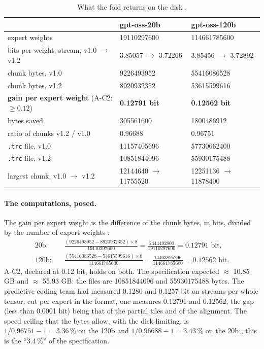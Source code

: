 \begin{table}[ht]
\centering\small
\caption[What the fold returns on the disk]{What the fold returns on the disk \mes.}
\label{t3cod:tab:tailles}
\begin{tabular}{@{}lll@{}}
\toprule
& gpt-oss-20b & gpt-oss-120b \\
\midrule
expert weights & \num{19110297600} & \num{114661785600} \\
bits per weight, stream, v1.0 $\to$ v1.2 & 3.85057 $\to$ 3.72266 & 3.85456 $\to$ 3.72892 \\
chunk bytes, v1.0 & \num{9226493952} & \num{55416086528} \\
chunk bytes, v1.2 & \num{8920932352} & \num{53615599616} \\
\textbf{gain per expert weight} (A-C2: $\ge 0.12$) & \textbf{0.12791 bit} & \textbf{0.12562 bit} \\
bytes saved & \num{305561600} & \num{1800486912} \\
ratio of chunks v1.2 / v1.0 & 0.96688 & 0.96751 \\
\texttt{.trc} file, v1.0 & \num{11157405696} & \num{57730662400} \\
\texttt{.trc} file, v1.2 & \num{10851844096} & \num{55930175488} \\
largest chunk, v1.0 $\to$ v1.2 & \num{12144640} $\to$ \num{11755520} & \num{12251136} $\to$ \num{11878400} \\
\bottomrule
\end{tabular}
\end{table}

\paragraph{The computations, posed.} The gain per expert weight is the difference of the chunk bytes, in bits, divided by the number of expert weights \calc:
\begin{align*}
\text{20b}:&\quad \frac{(\num{9226493952} - \num{8920932352}) \times 8}{\num{19110297600}} = \frac{\num{2444492800}}{\num{19110297600}} = 0.12791 \text{ bit},\\
\text{120b}:&\quad \frac{(\num{55416086528} - \num{53615599616}) \times 8}{\num{114661785600}} = \frac{\num{14403895296}}{\num{114661785600}} = 0.12562 \text{ bit}.
\end{align*}
A-C2, declared at 0.12 bit, holds on both. The specification expected $\approx$ 10.85 GB and $\approx$ 55.93 GB: the files are \num{10851844096} and \num{55930175488} bytes. The predictive coding team had measured 0.1280 and 0.1257 bit on streams per whole tensor; cut per expert in the format, one measures 0.12791 and 0.12562, the gap (less than 0.0001 bit) being that of the partial tiles and of the alignment. The speed ceiling that the bytes allow, with the disk limiting, is $1/0.96751 - 1 = 3.36\,\%$ on the 120b and $1/0.96688 - 1 = 3.43\,\%$ on the 20b \calc; this is the ``3.4\,\%'' of the specification.

